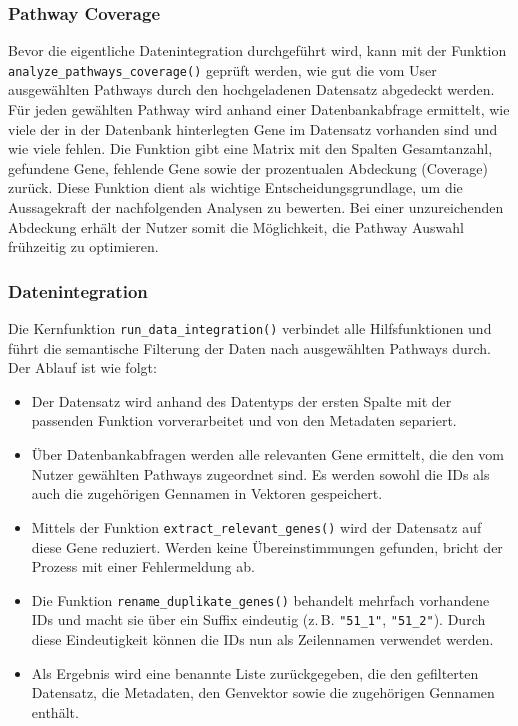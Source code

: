 \documentclass[12pt]{article}
\begin{document}
\subsubsection{Pathway Coverage}

\noindent Bevor die eigentliche Datenintegration durchgeführt wird, kann mit der Funktion \texttt{analyze\_\allowbreak pathways\_\allowbreak coverage()} geprüft werden, wie gut die vom User ausgewählten Pathways durch den hochgeladenen Datensatz abgedeckt werden. Für jeden gewählten Pathway wird anhand einer Datenbankabfrage ermittelt, wie viele der in der Datenbank hinterlegten Gene im Datensatz vorhanden sind und wie viele fehlen. Die Funktion gibt eine Matrix mit den Spalten Gesamtanzahl, gefundene Gene, fehlende Gene sowie der prozentualen Abdeckung (Coverage) zurück. Diese Funktion dient als wichtige Entscheidungsgrundlage, um die Aussagekraft der nachfolgenden Analysen zu bewerten. Bei einer unzureichenden Abdeckung erhält der Nutzer somit die Möglichkeit, die Pathway Auswahl frühzeitig zu optimieren.

\subsubsection{Datenintegration}
\label{subsec:semantische_integration}

\noindent Die Kernfunktion \texttt{run\_data\_integration()} verbindet alle Hilfsfunktionen und führt die semantische Filterung der Daten nach ausgewählten Pathways durch. Der Ablauf ist wie folgt:

\begin{itemize}
	\item Der Datensatz wird anhand des Datentyps der ersten Spalte mit der passenden Funktion vorverarbeitet und von den Metadaten separiert.
	\item Über Datenbankabfragen werden alle relevanten Gene ermittelt, die den vom Nutzer gewählten Pathways zugeordnet sind. Es werden sowohl die IDs als auch die zugehörigen Gennamen in Vektoren gespeichert.
	\item Mittels der Funktion \texttt{extract\_relevant\_genes()} wird der Datensatz auf diese Gene reduziert. Werden keine Übereinstimmungen gefunden, bricht der Prozess mit einer Fehlermeldung ab. 
	\item Die Funktion \texttt{rename\_duplikate\_genes()} behandelt mehrfach vorhandene IDs und macht sie über ein Suffix eindeutig (z.\,B. \texttt{"51\_1"}, \texttt{"51\_2"}). Durch diese Eindeutigkeit können die IDs nun als Zeilennamen verwendet werden.
	\item Als Ergebnis wird eine benannte Liste zurückgegeben, die den gefilterten Datensatz, die Metadaten, den Genvektor sowie die zugehörigen Gennamen enthält.
\end{itemize}
\end{document}
